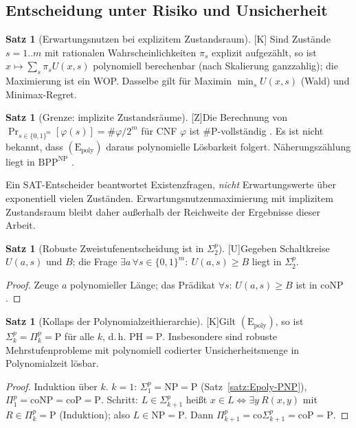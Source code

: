 \documentclass[a4paper,12pt]{article}
\theoremstyle{definition}
\newtheorem{satz}[definition]{Satz}
\newcommand{\tU}{\textsf{\small[U]}}   %
\newcommand{\tK}{\textsf{\small[K]}}   %
\newcommand{\tZ}{\textsf{\small[Z]}}   %
\newcommand{\bits}{\{0,1\}}
\newcommand{\cP}{\ensuremath{\mathrm{P}}}
\newcommand{\cNP}{\ensuremath{\mathrm{NP}}}
\newcommand{\cCoNP}{\ensuremath{\mathrm{coNP}}}
\newcommand{\cPH}{\ensuremath{\mathrm{PH}}}
\newcommand{\sharpP}{\ensuremath{\#\mathrm{P}}}
\newcommand{\Epoly}{(\mathrm{E}_{\mathrm{poly}})}
\begin{document}
\subsection{Entscheidung unter Risiko und Unsicherheit}
\begin{satz}[Erwartungsnutzen bei explizitem Zustandsraum]\tK
Sind Zustände \(s=1..m\) mit rationalen Wahrscheinlichkeiten \(\pi_s\) explizit aufgezählt, so ist \(x\mapsto\sum_s\pi_sU(x,s)\) polynomiell berechenbar (nach Skalierung ganzzahlig); die Maximierung ist ein WOP. Dasselbe gilt für Maximin \(\min_sU(x,s)\) (Wald) und Minimax-Regret.
\end{satz}

\begin{satz}[Grenze: implizite Zustandsräume]\tZ\label{satz:sharpP}
Die Berechnung von \(\Pr_{s\in\bits^m}[\varphi(s)]=\#\varphi/2^m\) für CNF \(\varphi\) ist \(\sharpP\)-vollständig \cite{valiant1979}. Es ist nicht bekannt, dass \(\Epoly\) daraus polynomielle Lösbarkeit folgert. Näherungszählung liegt in \(\mathrm{BPP}^{\cNP}\) \cite{stockmeyer1983}.
\end{satz}
Ein SAT-Entscheider beantwortet Existenzfragen, \emph{nicht} Erwartungswerte über exponentiell vielen Zuständen. Erwartungsnutzenmaximierung mit implizitem Zustandsraum bleibt daher außerhalb der Reichweite der Ergebnisse dieser Arbeit.

\begin{satz}[Robuste Zweistufenentscheidung ist in \(\Sigma_2^p\)]\tU\label{satz:robust}
Gegeben Schaltkreise \(U(a,s)\) und \(B\); die Frage \(\exists a\,\forall s\in\bits^m:\ U(a,s)\ge B\) liegt in \(\Sigma_2^{p}\).
\end{satz}
\begin{proof}
Zeuge \(a\) polynomieller Länge; das Prädikat \(\forall s:\,U(a,s)\ge B\) ist in \(\cCoNP\).
\end{proof}

\begin{satz}[Kollaps der Polynomialzeithierarchie]\tK\label{satz:PH}
Gilt \(\Epoly\), so ist \(\Sigma_k^p=\Pi_k^p=\cP\) für alle \(k\), d.\,h. \(\cPH=\cP\). Insbesondere sind robuste Mehrstufenprobleme mit polynomiell codierter Unsicherheitsmenge in Polynomialzeit lösbar.
\end{satz}
\begin{proof}
Induktion über \(k\). \(k=1\): \(\Sigma_1^p=\cNP=\cP\) (Satz~\ref{satz:Epoly-PNP}), \(\Pi_1^p=\cCoNP=\mathrm{co}\cP=\cP\). Schritt: \(L\in\Sigma_{k+1}^p\) heißt \(x\in L\iff\exists y\ R(x,y)\) mit \(R\in\Pi_k^p=\cP\) (Induktion); also \(L\in\cNP=\cP\). Dann \(\Pi_{k+1}^p=\mathrm{co}\Sigma_{k+1}^p=\mathrm{co}\cP=\cP\).
\end{proof}
\end{document}
